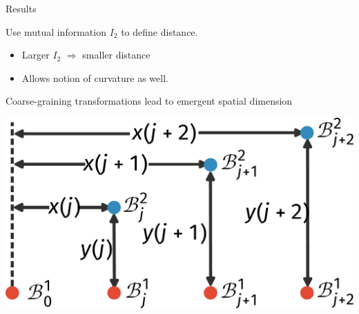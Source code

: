 \documentclass[aspectratio=169,t]{beamer}
\begin{document}
\begin{frame}{Results}
\begin{minipage}{0.53\textwidth}
	Use mutual information \(I_2\) to define \alert{distance}.
\begin{itemize}
	\item Larger \(I_2\) \(\Longrightarrow\) smaller distance\\[10pt]
	\item Allows notion of \alert{curvature} as well.\\[10pt]
\end{itemize}
Coarse-graining transformations lead to \alert{emergent} spatial dimension
\end{minipage}
\hspace*{\fill}
\begin{minipage}{0.43\textwidth}
	\includegraphics[width=\textwidth]{curvature-scheme.pdf}
\end{minipage}


\end{frame}
\end{document}
